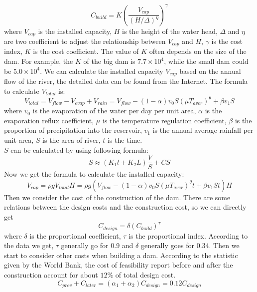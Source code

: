 \documentclass{mcmthesis}
\begin{document}
\begin{equation}
C_{build} = K(\frac{V_{cap}}{(H/\Delta)^{\eta}})^{\gamma}
\end{equation}
where $V_{cap}$ is the installed capacity, $H$ is the height of the water head, $\Delta$ and $\eta$ are two  coefficient to adjust the relationship between $V_{cap}$ and $H$, $\gamma$ is the cost index, $K$ is the cost coefficient. The value of $K$ often depends on the size of the dam. For example, the $K$ of the big dam is $7.7\times10^4$, while the small dam could be $5.0 \times 10^4$.
\indent We can calculate the installed capacity $V_{cap}$ based on the annual flow of the river, the detailed data can be found from the Internet. The formula to calculate $V_{total}$ is:
\begin{equation}
V_{total} = V_{flow} - V_{evap} + V_{rain} = V_{flow} - (1-{\alpha})v_{0}S({\mu}T_{aver})^{\theta} + {\beta}v_{1}S
\end{equation}
where $v_{0}$ is the evaporation of the water per day per unit area, $\alpha$ is the evaporation reflux coefficient, $\mu$ is the temperature regulation coefficient, $\beta$ is the proportion of precipitation into the reservoir, $v_{1}$ is the annual average rainfall per unit area, $S$ is the area of river, $t$ is the time.\\
\indent $S$ can be calculated by using following formula:
\begin{equation}
S \approx \left(K_{1}l + K_{2}L\right)\frac{V}{S} + CS
\end{equation}
\indent Now we get the formula to calculate the installed capacity:
\begin{equation}
V_{cap} = {\rho}gV_{total}H = {\rho}g(V_{flow} - (1 - {\alpha})v_{0}S({\mu}T_{aver})^{\theta}t + {\beta}v_{1}St)H
\end{equation}
\indent Then we consider the cost of the construction of the dam. There are some relations between the design costs and the construction cost, so we can directly get
\begin{equation}
C_{design} = {\delta}(C_{build})^{\tau}
\end{equation}
where $\delta$ is the proportional coefficient, $\tau$ is the proportional index. According to the data we get, $\tau$ generally go for 0.9 and $\delta$ generally goes for 0.34.
\indent Then we start to consider other costs when building a dam. According to the statistic given by the World Bank, the cost of feasibility report before and after the construction account for about $12\%$ of total design cost.
\begin{equation}
C_{prev} + C_{later}= (\alpha_{1} + \alpha_{2})C_{design} = 0.12C_{design}
\end{equation}
\end{document}
